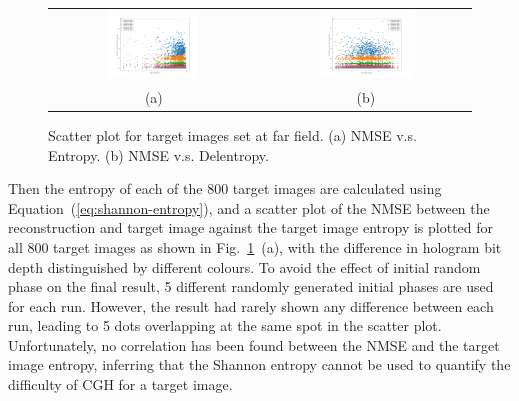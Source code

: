 	\begin{figure} [ht]
		\begin{center}
			\begin{tabular}{c c}
				\includegraphics[trim={80 50 90 70}, clip, width = 0.45\textwidth]{GS_Fraunhofer_NMSE_VS_Entropy.png} &
				\includegraphics[trim={80 50 90 70}, clip, width = 0.45\textwidth]{GS_Fraunhofer_NMSE_VS_Delentropy.png} \\
				(a) & (b)
			\end{tabular}
			\caption{\label{fig:GS_Fraunhofer_NMSE_VS_Entropy_Delentropy} Scatter plot for target images set at far field. (a) NMSE v.s. Entropy. (b) NMSE v.s. Delentropy.}
		\end{center}
	\end{figure}

	Then the entropy of each of the 800 target images are calculated using Equation~(\ref{eq:shannon-entropy}), and a scatter plot of the NMSE between the reconstruction and target image against the target image entropy is plotted for all 800 target images as shown in Fig.~\ref{fig:GS_Fraunhofer_NMSE_VS_Entropy_Delentropy}~(a), with the difference in hologram bit depth distinguished by different colours. To avoid the effect of initial random phase on the final result, 5 different randomly generated initial phases are used for each run. However, the result \cite{research_data_Sha2024} had rarely shown any difference between each run, leading to 5 dots overlapping at the same spot in the scatter plot. Unfortunately, no correlation has been found between the NMSE and the target image entropy, inferring that the Shannon entropy cannot be used to quantify the difficulty of CGH for a target image.

